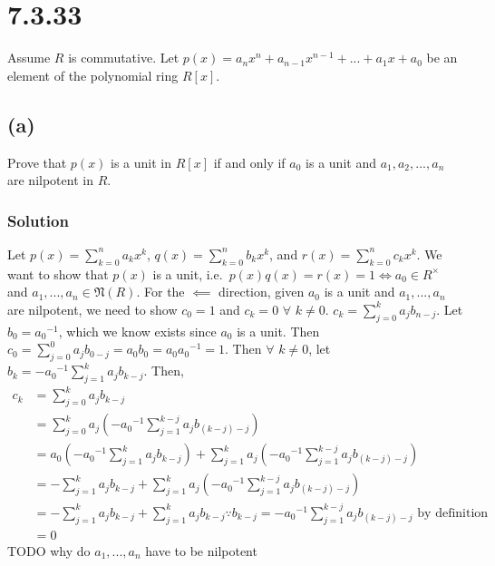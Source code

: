 \documentclass[fleqn]{article}
\begin{document}
    \section{7.3.33}
    Assume $R$ is commutative.  Let $p(x) = a_n x^n + a_{n - 1} x^{n - 1} + ... + a_1 x + a_0$ be an element of the polynomial ring $R[x]$.
        
        \subsection{(a)}
        Prove that $p(x)$ is a unit in $R[x]$ if and only if $a_0$ is a unit and $a_1, a_2, ..., a_n$ are nilpotent in $R$.
            
            \subsubsection{Solution}
            Let $p(x) = \sum\limits_{k = 0}^{n} a_k x^k$, $q(x) = \sum\limits_{k = 0}^{n} b_k x^k$, and $r(x) = \sum\limits_{k = 0}^{n} c_k x^k$.  We want to show that $p(x)$ is a unit, i.e.\ $p(x)q(x) = r(x) = 1 \iff a_0 \in R^\times$ and $a_1, ..., a_n \in \mathfrak{N}(R)$.  For the $\impliedby$ direction, given $a_0$ is a unit and $a_1, ..., a_n$ are nilpotent, we need to show $c_0 = 1$ and $c_k = 0$ $\forall$ $k \neq 0$.  $c_k = \sum\limits_{j = 0}^{k} a_j b_{n - j}$.  Let $b_0 = {a_0}^{-1}$, which we know exists since $a_0$ is a unit.  Then $c_0 = \sum\limits_{j = 0}^0 a_j b_{0 - j} = a_0 b_0 = a_0 {a_0}^{-1} = 1$.  Then $\forall$ $k \neq 0$, let $b_k = -{a_0}^{-1} \sum\limits_{j = 1}^{k} a_j b_{k - j}$.  Then,
            \begin{align}
                c_k &= \sum\limits_{j = 0}^{k} a_j b_{k - j} \\
                    &= \sum\limits_{j = 0}^{k} a_j \left(-{a_0}^{-1} \sum\limits_{j = 1}^{k - j} a_j b_{(k - j) - j}\right) \\
                    &= a_0 \left(-{a_0}^{-1} \sum\limits_{j = 1}^{k} a_j b_{k - j}\right) + \sum\limits_{j = 1}^{k} a_j \left(-{a_0}^{-1} \sum\limits_{j = 1}^{k - j} a_j b_{(k - j) - j}\right) \\
                    &= -\sum\limits_{j = 1}^{k} a_j b_{k - j} + \sum\limits_{j = 1}^{k} a_j \left(-{a_0}^{-1} \sum\limits_{j = 1}^{k - j} a_j b_{(k - j) - j}\right) \\
                    &= -\sum\limits_{j = 1}^{k} a_j b_{k - j} + \sum\limits_{j = 1}^{k} a_j b_{k - j} \because{} b_{k - j} = -{a_0}^{-1} \sum\limits_{j = 1}^{k - j} a_j b_{(k - j) - j} \text{ by definition}\\
                    &= 0
            \end{align}
            TODO why do $a_1, ..., a_n$ have to be nilpotent
        
\end{document}
